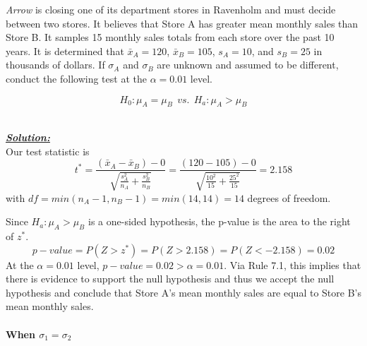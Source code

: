 \begin{example}
\textit{Arrow} is closing one of its department stores in Ravenholm and must decide between two stores. It believes that Store A has greater mean monthly sales than Store B. It samples 15 monthly sales totals from each store over the past 10 years. It is determined that $\bar{x}_A = 120$, $\bar{x}_B=105$, $s_A = 10$, and $s_B=25$ in thousands of dollars. If $\sigma_A$ and $\sigma_B$ are unknown and assumed to be different, conduct the following test at the $\alpha=0.01$ level. 

\[ H_0 : \mu_A = \mu_B ~~vs.~~ H_a : \mu_A > \mu_B \]


\hfill\\
{\emph{\textbf{\underline{Solution:}}}}\\

Our test statistic is 
\[ t^{*} =\frac{(\bar{x}_A - \bar{x}_B)-0}{\sqrt{\displaystyle\frac{s_A^2}{n_A} + \frac{s_B^2}{n_B}}} = \frac{(120-105)-0}{\sqrt{\displaystyle\frac{10^2}{15}+\frac{25^2}{15}}}=2.158 \]
with $df=min(n_A-1,n_B-1) = min(14,14) = 14$ degrees of freedom. 

Since $H_a: \mu_A > \mu_B$ is a one-sided hypothesis, the p-value is the area to the right of $z^{*}$. 
\[ p-value = P(Z>z^{*}) = P(Z> 2.158) = P(Z < -2.158) = 0.02\]
At the $\alpha=0.01$ level, $p-value = 0.02 > \alpha = 0.01$. Via Rule 7.1, this implies that there is evidence to support the null hypothesis and thus we accept the null hypothesis and conclude that Store A's mean monthly sales are equal to Store B's mean monthly sales. 
\end{example} 







\paragraph{When $\sigma_{1} = \sigma_{2}$}~ \hfill



